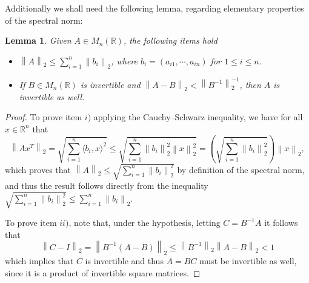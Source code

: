 \documentclass[12pt]{article} %
\newcommand{\R}{\mathbb{R}}
\newcommand{\bs}{\boldsymbol}
\newtheorem{lemma}{Lemma}
\theoremstyle{definition}
\begin{document}

Additionally we shall need the following lemma, regarding elementary properties of the spectral norm:
\begin{lemma}\label{matrices} Given $A\in M_n(\R)$, the following items hold
\begin{itemize}
\item[i)] $ \left\|A\right\|_2 \leq \sum_{i=1}^n \left\|b_i\right\|_2$,
where $b_i = (a_{i1},\cdots,a_{in})$ for $1\leq i\leq n$.
\item[ii)] If $B\in M_n(\R)$ is invertible and
$\left\|A-B\right\|_2<\left\|B^{-1}\right\|_2^{-1}$,
then $A$ is invertible as well.
\end{itemize}
\end{lemma}
\begin{proof}To prove item $i)$ applying the Cauchy–Schwarz inequality, we have for all $x\in \R^n$ that
\begin{equation*}
\left\|Ax^T\right\|_2 = \sqrt{\sum_{i=1}^n \langle b_i, x\rangle^2} \leq \sqrt{\sum_{i=1}^n \left\|b_i\right\|_2^2 \left\|x\right\|_2^2}=\left(\sqrt{\sum_{i=1}^n \left\|b_i\right\|_2^2}\right)\left\|x\right\|_2,
\end{equation*}
which proves that $\left\|A\right\|_2\leq \sqrt{\sum_{i=1}^n \left\|b_i\right\|_2^2}$ by definition of the spectral norm, and thus the result follows directly from the inequality $\sqrt{\sum_{i=1}^n \left\|b_i\right\|_2^2}\leq \sum_{i=1}^n \left\|b_i\right\|_2$.

To prove item $ii)$, note that, under the hypothesis, letting $C=B^{-1}A$ it follows that
\begin{equation*}
\left\|C-I\right\|_2 = \left\|B^{-1}(A-B)\right\|_2\leq \left\|B^{-1}\right\|_2\left\|A-B\right\|_2 < 1
\end{equation*}
which implies that $C$ is invertible and thus $A=BC$ must be invertible as well, since it is a product of invertible square matrices.
\end{proof}
\end{document}
